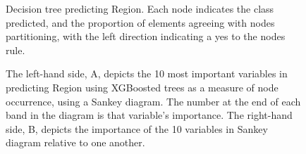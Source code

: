 \documentclass[review,12pt,authoryear]{elsarticle}
\begin{document}
\begin{linenumbers}
\begin{figure}
  \caption{Decision tree predicting Region. Each node indicates the class predicted, and the proportion of elements agreeing with nodes partitioning, with the left direction indicating a yes to the nodes rule.}\label{fig:region_tree}
 \end{figure}
 
 \begin{figure}
  \caption{The left-hand side, A,  depicts the 10 most important variables in predicting Region using XGBoosted trees as a measure of node occurrence, using a Sankey diagram. The number at the end of each band in the diagram is that variable's importance. The right-hand side, B, depicts the importance of the 10 variables in Sankey diagram relative to one another.}\label{fig:region_sankey}
 \end{figure}


\end{linenumbers}
\end{document}
